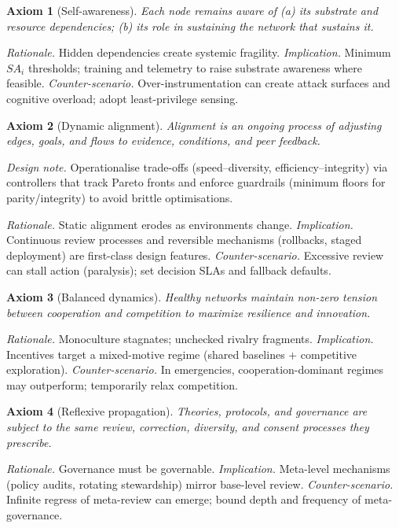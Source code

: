\documentclass[12pt]{article}
\newtheorem{axiom}{Axiom}
\begin{document}
\begin{axiom}[Self-awareness] Each node remains aware of (a) its substrate and resource dependencies; (b) its role in sustaining the network that sustains it.

\end{axiom}
\emph{Rationale.} Hidden dependencies create systemic fragility. 
\emph{Implication.} Minimum $SA_i$ thresholds; training and telemetry to raise substrate awareness where feasible.
\emph{Counter-scenario.} Over-instrumentation can create attack surfaces and cognitive overload; adopt least-privilege sensing.

\begin{axiom}[Dynamic alignment] Alignment is an ongoing process of adjusting edges, goals, and flows to evidence, conditions, and peer feedback.

\end{axiom}
\emph{Design note.} Operationalise trade-offs (speed--diversity, efficiency--integrity) via controllers that track Pareto fronts and enforce guardrails (minimum floors for parity/integrity) to avoid brittle optimisations.

\emph{Rationale.} Static alignment erodes as environments change. 
\emph{Implication.} Continuous review processes and reversible mechanisms (rollbacks, staged deployment) are first-class design features.
\emph{Counter-scenario.} Excessive review can stall action (paralysis); set decision SLAs and fallback defaults.

\begin{axiom}[Balanced dynamics] Healthy networks maintain non-zero tension between cooperation and competition to maximize resilience and innovation.

\end{axiom}
\emph{Rationale.} Monoculture stagnates; unchecked rivalry fragments. 
\emph{Implication.} Incentives target a mixed-motive regime (shared baselines + competitive exploration).
\emph{Counter-scenario.} In emergencies, cooperation-dominant regimes may outperform; temporarily relax competition.

\begin{axiom}[Reflexive propagation] Theories, protocols, and governance are subject to the same review, correction, diversity, and consent processes they prescribe.

\end{axiom}
\emph{Rationale.} Governance must be governable. 
\emph{Implication.} Meta-level mechanisms (policy audits, rotating stewardship) mirror base-level review.
\emph{Counter-scenario.} Infinite regress of meta-review can emerge; bound depth and frequency of meta-governance.
\end{document}
